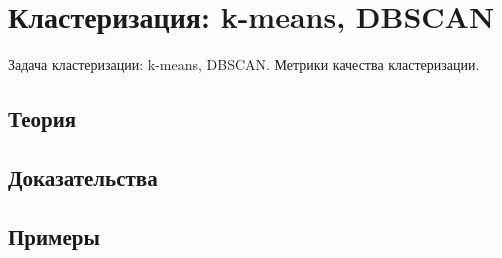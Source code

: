 
\section{Кластеризация: k-means, DBSCAN}
\label{sec:1.4.06-clustering}

\begin{ticket}
Задача кластеризации: k-means, DBSCAN. Метрики качества кластеризации.
\end{ticket}

\subsection*{Теория}

\subsection*{Доказательства}

\subsection*{Примеры}
